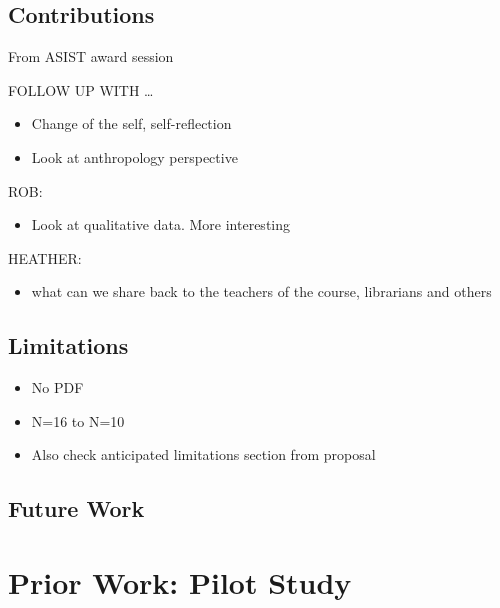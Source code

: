 \documentclass[letterpaper, nobind]{templates/ociamthesis}
\providecommand{\tightlist}{%
  \setlength{\itemsep}{0pt}\setlength{\parskip}{0pt}}
\begin{document}
\hypertarget{contributions}{%
\section{Contributions}\label{contributions}}

From ASIST award session

FOLLOW UP WITH \ldots{}

\begin{itemize}
\tightlist
\item
  Change of the self, self-reflection
\item
  Look at anthropology perspective
\end{itemize}

ROB:

\begin{itemize}
\tightlist
\item
  Look at qualitative data. More interesting
\end{itemize}

HEATHER:

\begin{itemize}
\tightlist
\item
  what can we share back to the teachers of the course, librarians and others
\end{itemize}

\hypertarget{limitations}{%
\section{Limitations}\label{limitations}}

\begin{itemize}
\tightlist
\item
  No PDF
\item
  N=16 to N=10
\item
  Also check anticipated limitations section from proposal
\end{itemize}

\hypertarget{future-work}{%
\section{Future Work}\label{future-work}}

\startappendices

\hypertarget{app-pilot-study}{%
\chapter{Prior Work: Pilot Study}\label{app-pilot-study}}
\end{document}
